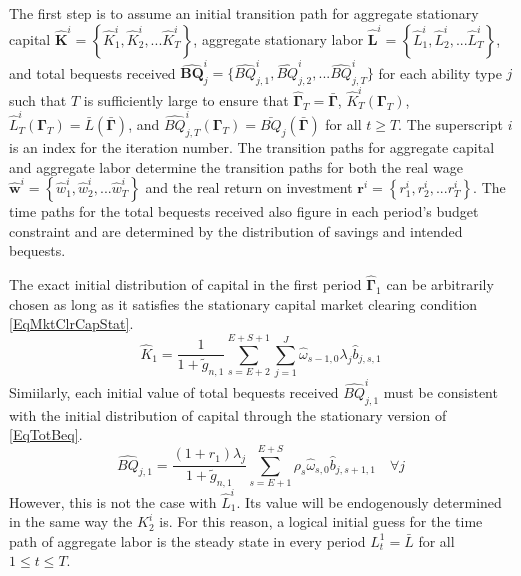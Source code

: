   The first step is to assume an initial transition path for aggregate stationary capital $\bm{\hat{K}}^i = \left\{\hat{K}_1^i,\hat{K}_2^i,...\hat{K}_T^i\right\}$, aggregate stationary labor $\bm{\hat{L}}^i = \left\{\hat{L}_1^i,\hat{L}_2^i,...\hat{L}_T^i\right\}$, and total bequests received $\bm{\hat{BQ}}_j^i=\{\hat{BQ}_{j,1}^i,\hat{BQ}_{j,2}^i,...\hat{BQ}_{j,T}^i\}$ for each ability type $j$ such that $T$ is sufficiently large to ensure that $\bm{\hat{\Gamma}}_T = \bar{\bm{\Gamma}}$, $\hat{K}_T^i\left(\bm{\Gamma}_T\right)$, $\hat{L}_T^i\left(\bm{\Gamma}_T\right) = \bar{L}\left(\bar{\bm{\Gamma}}\right)$, and $\hat{BQ}_{j,T}^i\left(\bm{\Gamma}_T\right) = \bar{BQ}_j\left(\bar{\bm{\Gamma}}\right)$ for all $t\geq T$. The superscript $i$ is an index for the iteration number. The transition paths for aggregate capital and aggregate labor determine the transition paths for both the real wage $\bm{\hat{w}}^i = \left\{\hat{w}_1^i,\hat{w}_2^i,...\hat{w}_T^i\right\}$ and the real return on investment $\bm{r}^i = \left\{r_1^i,r_2^i,...r_T^i\right\}$. The time paths for the total bequests received also figure in each period's budget constraint and are determined by the distribution of savings and intended bequests.

  The exact initial distribution of capital in the first period $\bm{\hat{\Gamma}}_1$ can be arbitrarily chosen as long as it satisfies the stationary capital market clearing condition \eqref{EqMktClrCapStat}.
  \begin{equation}\label{EqMktClrCapStat1}
    \hat{K}_1 = \frac{1}{1 + \tilde{g}_{n,1}}\sum_{s=E+2}^{E+S+1}\sum_{j=1}^{J}\hat{\omega}_{s-1,0}\lambda_j \hat{b}_{j,s,1}
  \end{equation}
  Simiilarly, each initial value of total bequests received $\hat{BQ}_{j,1}^i$ must be consistent with the initial distribution of capital through the stationary version of \eqref{EqTotBeq}.
  \begin{equation}\label{EqTotBeqStat1}
    \hat{BQ}_{j,1} = \frac{(1+r_1)\lambda_j}{1+\tilde{g}_{n,1}}\sum_{s=E+1}^{E+S}\rho_s\hat{\omega}_{s,0}\hat{b}_{j,s+1,1} \quad\forall j
  \end{equation}
  However, this is not the case with $\hat{L}_1^i$. Its value will be endogenously determined in the same way the $K_2^i$ is. For this reason, a logical initial guess for the time path of aggregate labor is the steady state in every period $L_t^1 = \bar{L}$ for all $1\leq t\leq T$.

